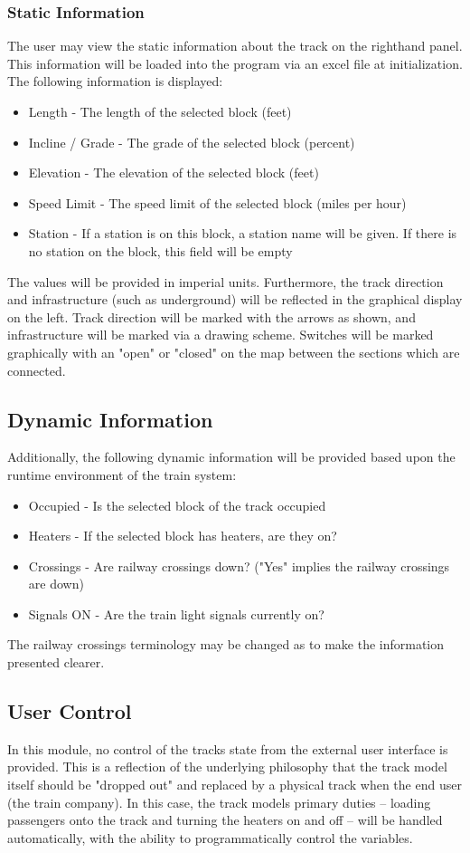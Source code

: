 \documentclass[letterpaper]{article}
\begin{document}
	\subsubsection{Static Information}
	The user may view the static information about the track on the righthand panel. This information will be loaded into the program via an excel file at initialization. The following information is displayed:
		\begin{itemize}
			\item Length - The length of the selected block (feet)
			\item Incline / Grade - The grade of the selected block (percent)
			\item Elevation - The elevation of the selected block (feet)
			\item Speed Limit - The speed limit of the selected block (miles per hour)
			\item Station - If a station is on this block, a station name will be given. If there is no station on the block, this field will be empty
		\end{itemize}
		The values will be provided in imperial units. Furthermore, the track direction and infrastructure (such as underground) will be reflected in the graphical display on the left. Track direction will be marked with the arrows as shown, and infrastructure will be marked via a drawing scheme. Switches will be marked graphically with an "open" or "closed" on the map between the sections which are connected.

\subsection{Dynamic Information}
		Additionally, the following dynamic information will be provided based upon the runtime environment of the train system:
		\begin{itemize}
			\item Occupied - Is the selected block of the track occupied
			\item Heaters - If the selected block has heaters, are they on?
			\item Crossings - Are railway crossings down? ("Yes" implies the railway crossings are down)
			\item Signals ON - Are the train light signals currently on?
		\end{itemize}
		The railway crossings terminology may be changed as to make the information presented clearer.

\subsection{User Control}
In this module, no control of the tracks state from the external user interface is provided. This is a reflection of the underlying philosophy that the track model itself should be "dropped out" and replaced by a physical track when the end user (the train company). In this case, the track models primary duties -- loading passengers onto the track and turning the heaters on and off -- will be handled automatically, with the ability to programmatically control the variables.
\end{document}
